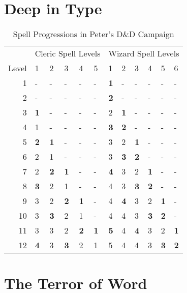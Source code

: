 \documentclass[11pt]{book}
\newcommand{\f}{\bfseries}
\begin{document}
\section{Deep in Type}
\lipsum[7]
\begin{table}[t]
\centering
\begin{tabular}{rlllllllllll}
\toprule
& \multicolumn{5}{c}{Cleric Spell Levels}
& \multicolumn{6}{c}{Wizard Spell Levels}\\
\cmidrule(lr){2-6}\cmidrule(lr){7-12}
Level &
        1 &    2 &    3 &    4 &    5 &    1 &    2 &    3 &    4 &    5 &    6\\
\midrule
\rowcolor{lightgray}
 1 &    - &    - &    - &    - &    -
   & \f 1 &    - &    - &    - &    - &    -\\
\rowcolor{lightgray}
 2 &    - &    - &    - &    - &    -
   & \f 2 &    - &    - &    - &    - &    -\\
\rowcolor{lightgray}
 3 & \f 1 &    - &    - &    - &    -
   &    2 & \f 1 &    - &    - &    - &    -\\
\rowcolor{white}
 4 &    1 &    - &    - &    - &    -
   & \f 3 & \f 2 &    - &    - &    - &    -\\
\rowcolor{white}
 5 & \f 2 & \f 1 &    - &    - &    -
   &    3 &    2 & \f 1 &    - &    - &    -\\
\rowcolor{white}
 6 &    2 &    1 &    - &    - &    -
   &    3 & \f 3 & \f 2 &    - &    - &    -\\
\rowcolor{lightgray}
 7 &    2 & \f 2 & \f 1 &    - &    -
   & \f 4 &    3 &    2 & \f 1 &    - &    -\\
\rowcolor{lightgray}
 8 & \f 3 &    2 &    1 &    - &    -
   &    4 &    3 & \f 3 & \f 2 &    - &    -\\
\rowcolor{lightgray}
 9 &    3 &    2 & \f 2 & \f 1 &    -
   &    4 & \f 4 &    3 &    2 & \f 1 &    -\\
\rowcolor{white}
10 &    3 & \f 3 &    2 &    1 &    -
   &    4 &    4 &    3 & \f 3 & \f 2 &    -\\
\rowcolor{white}
11 &    3 &    3 &    2 & \f 2 & \f 1
   & \f 5 &    4 & \f 4 &    3 &    2 & \f 1\\
\rowcolor{white}
12 & \f 4 &    3 & \f 3 &    2 &    1
   &    5 &    4 &    4 &    3 & \f 3 & \f 2\\
\bottomrule
\end{tabular}
\caption{Spell Progressions in Peter's D\&D Campaign}
\end{table}
\lipsum[8-10]

\section{The Terror of Word}
\lipsum[4-5]
\end{document}
